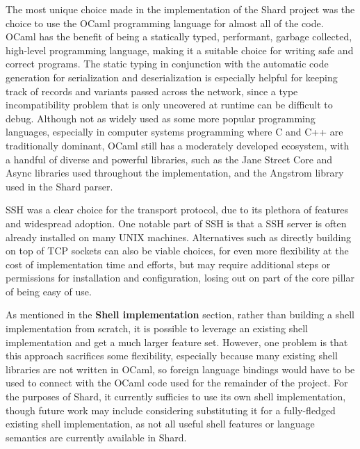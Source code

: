 \documentclass[twoside]{report}
\newcommand{\todoi}[1]{\todo[inline, color=blue!20]{TODO: {#1}}}
\begin{document}
The most unique choice made in the implementation of the Shard project was the choice to use the OCaml programming language for almost all of the code.
OCaml has the benefit of being a statically typed, performant, garbage collected, high-level programming language, making it a suitable choice for writing safe and correct programs.
The static typing in conjunction with the automatic code generation for serialization and deserialization is especially helpful for keeping track of records and variants passed across the network, since a type incompatibility problem that is only uncovered at runtime can be difficult to debug.
Although not as widely used as some more popular programming languages, especially in computer systems programming where C and C++ are traditionally dominant, OCaml still has a moderately developed ecosystem, with a handful of diverse and powerful libraries, such as the Jane Street Core and Async libraries used throughout the implementation, and the Angstrom library used in the Shard parser.

SSH was a clear choice for the transport protocol, due to its plethora of features and widespread adoption.
One notable part of SSH is that a SSH server is often already installed on many UNIX machines.
Alternatives such as directly building on top of TCP sockets can also be viable choices, for even more flexibility at the cost of implementation time and efforts, but may require additional steps or permissions for installation and configuration, losing out on part of the core pillar of being easy of use.

As mentioned in the \textbf{Shell implementation} section, rather than building a shell implementation from scratch, it is possible to leverage an existing shell implementation and get a much larger feature set.
However, one problem is that this approach sacrifices some flexibility, especially because many existing shell libraries are not written in OCaml, so foreign language bindings would have to be used to connect with the OCaml code used for the remainder of the project.
For the purposes of Shard, it currently sufficies to use its own shell implementation, though future work may include considering substituting it for a fully-fledged existing shell implementation, as not all useful shell features or language semantics are currently available in Shard.
\end{document}
